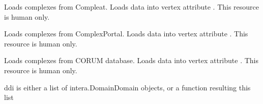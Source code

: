 \documentclass[letterpaper,10pt,english]{sphinxmanual}
\begin{document}
\begin{fulllineitems}
\begin{fulllineitems}
\end{fulllineitems}


\begin{fulllineitems}
\label{\detokenize{main:pypath.main.PyPath.load_compleat}}
Loads complexes from Compleat. Loads data into vertex attribute
.
This resource is human only.

\end{fulllineitems}


\begin{fulllineitems}
\label{\detokenize{main:pypath.main.PyPath.load_complexportal}}
Loads complexes from ComplexPortal. Loads data into vertex attribute
.
This resource is human only.

\end{fulllineitems}


\begin{fulllineitems}
\label{\detokenize{main:pypath.main.PyPath.load_corum}}
Loads complexes from CORUM database. Loads data into vertex attribute
.
This resource is human only.

\end{fulllineitems}


\begin{fulllineitems}
\label{\detokenize{main:pypath.main.PyPath.load_ddi}}
ddi is either a list of intera.DomainDomain objects,
or a function resulting this list

\end{fulllineitems}



\end{fulllineitems}
\end{document}

